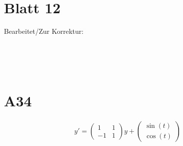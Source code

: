 \documentclass[fleqn,12pt]{scrartcl}
\newcommand{\blattn}{Blatt 12}
\begin{document}
\section*{\blattn}
Bearbeitet/Zur Korrektur:

\noindent
\begin{Form}
	\\
	\\
	\\
\end{Form}

\section*{A34}
\begin{align*}
y' = \begin{pmatrix} 1 & 1 \\ -1 & 1 \end{pmatrix}y + \begin{pmatrix} \sin(t)\\ \cos(t) \end{pmatrix}
\end{align*}
\end{document}
